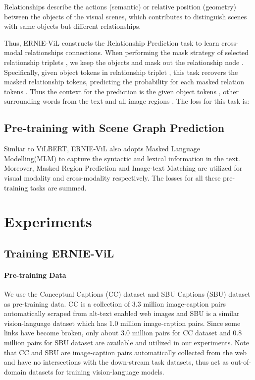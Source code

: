 \documentclass[letterpaper]{article} \usepackage{aaai21}  \usepackage{times}  \usepackage{helvet} \usepackage{courier}  \usepackage[hyphens]{url}  \usepackage{graphicx} \urlstyle{rm} \def\UrlFont{\rm}  \usepackage{natbib}  \usepackage{caption} \frenchspacing  \setlength{\pdfpagewidth}{8.5in}  \setlength{\pdfpageheight}{11in}  \usepackage{cite}
\begin{document}
Relationships describe the actions (semantic) or  relative position (geometry) between the objects of the visual scenes, which contributes to distinguish scenes with same objects but different relationships. 


Thus, ERNIE-ViL constructs the Relationship Prediction task to learn cross-modal  relationships connections. When performing the mask strategy of selected relationship triplets , we keep the objects and mask out the relationship node . Specifically,  
 given object tokens  in relationship triplet , this task recovers the masked relationship tokens, predicting the probability for each masked relation tokens . Thus the context for the prediction is  the given object tokens , other surrounding words from the text and all image regions . The loss for this task is:



\subsection{Pre-training with Scene Graph Prediction}

Simliar to ViLBERT\cite{lu2019vilbert}, ERNIE-ViL also adopts Masked Language Modelling(MLM) to capture the syntactic and lexical information in the text. Moreover, Masked Region Prediction and Image-text Matching are utilized for visual modality and cross-modality respectively. The losses for all these pre-training tasks are summed.

\section{Experiments}
\subsection{Training ERNIE-ViL}

\paragraph{Pre-training Data} We use the Conceptual Captions (CC) dataset \cite{sharma2018conceptual} and SBU Captions (SBU) dataset \cite{ordonez2011im2text} as pre-training data. CC is a collection of 3.3 million image-caption pairs automatically scraped from alt-text enabled web images and SBU is a similar vision-language dataset which has 1.0 million image-caption pairs. Since some links have become broken, only about 3.0 million pairs for CC dataset and 0.8 million pairs for SBU dataset are available and utilized in our experiments. Note that CC and SBU are image-caption pairs automatically collected from the web and have no intersections with the down-stream task datasets, thus act as out-of-domain datasets for training vision-language models.
\end{document}
